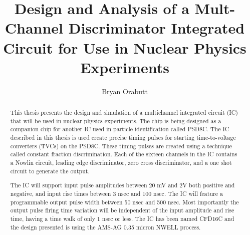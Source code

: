 \documentclass[12pt,oneside,final]{siuethesis}
\author{Bryan Orabutt}
\title{Design and Analysis of a Mult-Channel Discriminator Integrated Circuit for Use in Nuclear Physics Experiments}
\theoremstyle{definition}
\begin{document}
\maketitle 

\frontmatter %

\copyrightpage %



\begin{abstract}

\par This thesis presents the design and simulation of a multichannel integrated circuit (IC) that will be used in nuclear physics experiments. The chip is being designed as a companion chip for another IC used in particle identification called PSD8C. The IC described in this thesis is used create precise timing pulses for starting time-to-voltage converters (TVCs) on the PSD8C. These timing pulses are created using a technique called constant fraction discrimination. Each of the sixteen channels in the IC contains a Nowlin circuit, leading edge discriminator, zero cross discriminator, and a one shot circuit to generate the output. \par The IC will support input pulse amplitudes between 20 mV and 2V both positive and negative, and input rise times between 3 nsec and 100 nsec. The IC will feature a programmable output pulse width between 50 nsec and 500 nsec. Most importantly the output pulse firing time variation will be independent of the input amplitude and rise time, having a time walk of only 1 nsec or less. The IC has been named CFD16C and the design presented is using the AMS-AG 0.35 micron NWELL process.
\end{abstract}


\end{document}

